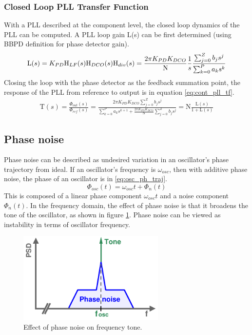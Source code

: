 		\subsubsection{Closed Loop PLL Transfer Function}\label{cont_pll_tf}
			With a PLL described at the component level, the closed loop dynamics of the PLL can be computed. A PLL loop gain L(s) can be first determined (using BBPD definition for phase detector gain). 
			\begin{equation}
				\mathrm{L}(s) = K_{PD}\textnormal{H}_{LF}(s)\textnormal{H}_{DCO}(s)\textnormal{H}_{div}(s) = \frac{2\pi K_{PD}K_{DCO}}{\mathrm{N}}\frac{1}{s}\frac{\sum_{j=0}^Z b_js^j}{\sum_{k=0}^P a_ks^k}
			\end{equation}
			Closing the loop with the phase detector as the feedback summation point, the response of the PLL from reference to output is in equation \ref{eq:cont_pll_tf}.
			\begin{align} \label{eq:cont_pll_tf}
				\mathrm{T}(s) = \frac{\Phi_{out}(s)}{\Phi_{ref}(s)} = \frac{2\pi K_{PD}K_{DCO}\sum_{j=0}^Z b_js^j}{\sum_{k=0}^P a_ks^{k+1} + \frac{2\pi K_{PD}K_{DCO}}{\mathrm{N}}\sum_{j=0}^Z b_js^j} = \mathrm{N}\frac{\mathrm{L}(s)}{1 + \mathrm{L}(s)}
			\end{align}



	\subsection{Phase noise}
		Phase noise can be described as undesired variation in an oscillator's phase trajectory from ideal. If an oscillator's frequency is $\omega_{osc}$, then with additive phase noise, the phase of an oscillator is in \ref{eq:osc_ph_traj}. 
		\begin{equation}\label{eq:osc_ph_traj}
			\Phi_{osc}(t) = \omega_{osc}t + \Phi_n(t)
		\end{equation}
		This is composed of a linear phase component $\omega_{osc}t$ and a noise component $\Phi_n(t)$. In the frequency domain, the effect of phase noise is that it broadens the tone of the oscillator, as shown in figure \ref{fig:phase_noise_psd}. Phase noise can be viewed as instability in terms of oscillator frequency.
		\begin{figure}[htb!]
	        \centering
	        \includegraphics[width=0.65\textwidth, angle=0]{./figs/theory/phase_noise_psd}
		    \caption{Effect of phase noise on frequency tone.}
		    \label{fig:phase_noise_psd}
		\end{figure}

